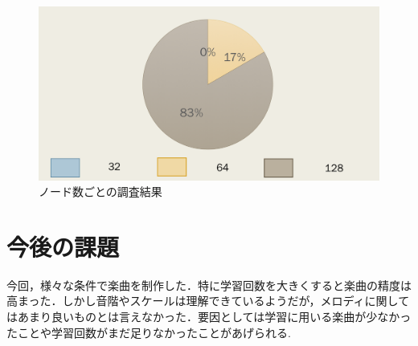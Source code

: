 \newpage
\begin{figure}[h]
    \begin{screen}
    \begin{center}
        \includegraphics[scale=0.6, clip]{./img/glaph3.png}
        \caption{ノード数ごとの調査結果}
        \label{fig:ノード数の調査結果}
    \end{center}
    \end{screen}
\end{figure}
\newpage
\section{今後の課題}
今回，様々な条件で楽曲を制作した．特に学習回数を大きくすると楽曲の精度は高まった．しかし音階やスケールは理解できているようだが，メロディに関してはあまり良いものとは言えなかった．要因としては学習に用いる楽曲が少なかったことや学習回数がまだ足りなかったことがあげられる.